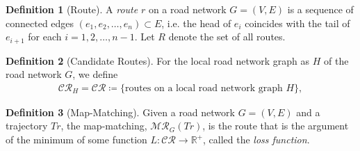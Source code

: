 \documentclass{article}
\numberwithin{equation}{section}
\theoremstyle{definition}
\newtheorem{definition}{Definition}[section]
\newcommand{\CR}{\mathcal{CR}}
\def\:={\coloneqq} %
\begin{document}
\begin{definition}[Route]
A \emph{route} $r$ on a road network $G=(V,E)$ is a sequence of connected edges $(e_1,e_2,\dots,e_n)\subset E$, i.e. 
the head of $e_i$ coincides with the tail of $e_{i+1}$ for each $i = 1, 2, \dots, n-1$.
Let $R$ denote the set of all routes.
\end{definition}
\begin{definition}[Candidate Routes]
For the local road network graph as $H$ of the road network $G$, we define 
\begin{align*}
    \CR_H = \CR \:= \{ \text{routes on a local road network graph $H$} \},
\end{align*}
\end{definition}


\begin{definition}[Map-Matching]
Given a road network $G=(V, E)$ and a trajectory
$Tr$, the map-matching, $\mathcal{MR}_G(Tr)$, is the route that is the argument of the minimum of some function $L:\CR\rightarrow \mathbb{R}^+$, called the \emph{loss function}. 
\end{definition}

\end{document}

